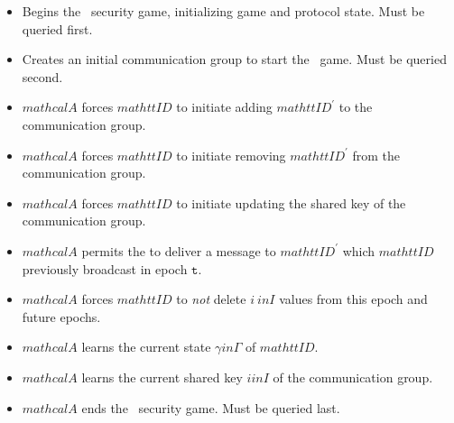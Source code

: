 \begin{itemize}

\item {}
Begins the \CGKAsec\ security game, initializing game and protocol state. Must be queried first.

\item {}
Creates an initial communication group to start the \CGKAsec\ game. Must be queried second.

\item {}
\(mathcal{A}\) forces \(mathtt{ID}\) to initiate adding \(mathtt{ID}^{'}\) to the communication group.

\item {}
\(mathcal{A}\) forces \(mathtt{ID}\) to initiate removing \(mathtt{ID}^{'}\) from the communication group.

\item {}
\(mathcal{A}\) forces \(mathtt{ID}\) to initiate updating the shared key of the communication group.

\item {}
\(mathcal{A}\) permits the  to deliver a message to \(mathtt{ID}^{'}\) which \(mathtt{ID}\) previously broadcast in epoch \(\mathtt{t}\).

\item {}
\(mathcal{A}\) forces \(mathtt{ID}\) to \emph{not} delete \(i \ in I\) values from this epoch and future epochs.

\item {}
\(mathcal{A}\) learns the current state \(\gamma in \Gamma\) of \(mathtt{ID}\).

\item {}
\(mathcal{A}\) learns the current shared key \(i in I\) of the communication group.

\item {}
\(mathcal{A}\) ends the \CGKAsec\ security game. Must be queried last.

\end{itemize}

